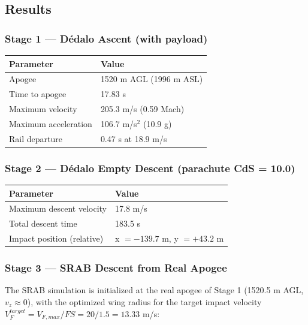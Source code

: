 \subsection{Results}

\subsubsection{Stage 1 — Dédalo Ascent (with payload)}

\begin{center}
\begin{tabular}{ll}
\toprule
\textbf{Parameter} & \textbf{Value} \\
\midrule
Apogee & 1520 m AGL (1996 m ASL) \\
Time to apogee & 17.83 s \\
Maximum velocity & 205.3 m/s (0.59 Mach) \\
Maximum acceleration & 106.7 m/s$^2$ (10.9 g) \\
Rail departure & 0.47 s at 18.9 m/s \\
\bottomrule
\end{tabular}
\end{center}

\subsubsection{Stage 2 — Dédalo Empty Descent (parachute CdS = 10.0)}

\begin{center}
\begin{tabular}{ll}
\toprule
\textbf{Parameter} & \textbf{Value} \\
\midrule
Maximum descent velocity & 17.8 m/s \\
Total descent time & 183.5 s \\
Impact position (relative) & x $= -139.7$ m, y $= +43.2$ m \\
\bottomrule
\end{tabular}
\end{center}

\subsubsection{Stage 3 — SRAB Descent from Real Apogee}

The SRAB simulation is initialized at the real apogee of Stage 1
(1520.5 m AGL, $v_z \approx 0$), with the optimized wing radius for
the target impact velocity $V_F^{target} = V_{F,max}/FS =
20/1.5 = 13.33$ m/s:

